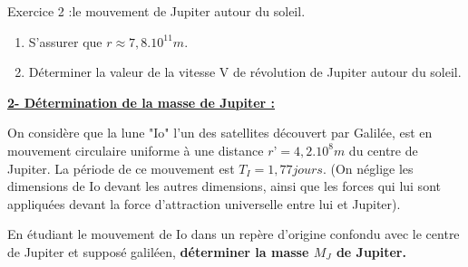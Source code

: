 \documentclass[12pt, french]{article}
\begin{document}
\begin{Box2}{Exercice 2 :le mouvement de Jupiter autour du soleil. }
\begin{enumerate}
\begin{enumerate}
		\end{enumerate}
	\item S’assurer que $r \approx 7,8.10^{11}m$.
	\item  Déterminer la valeur de la vitesse V de révolution de Jupiter autour du
soleil. 
\end{enumerate}

\textbf{\underline{2- Détermination de la masse de Jupiter : }}

On considère que la lune "Io" l’un des satellites découvert par Galilée, est en
mouvement circulaire uniforme à une distance $r’ = 4,2.10^8 m$ du centre de Jupiter.
La période de ce mouvement est $T_I = 1,77 jours$.
(On néglige les dimensions de Io devant les autres dimensions, ainsi que les forces qui
lui sont appliquées devant la force d’attraction universelle entre lui et Jupiter).

En étudiant le mouvement de Io dans un repère d’origine confondu avec le centre de
Jupiter et supposé galiléen, \textbf{déterminer la masse $M_J$ de Jupiter.}
\end{Box2}













\end{document}
